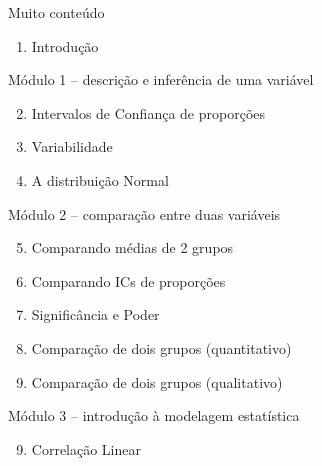 \documentclass{beamer}
\begin{document}
\begin{frame}{\scriptsize Muito conteúdo}
  \begin{enumerate}
    \tiny
  \item Introdução
  \end{enumerate}

  \begin{block}{\scriptsize Módulo 1 -- descrição e inferência de uma variável}
    \begin{enumerate}
      \setcounter{enumi}{1}
      \tiny
    \item Intervalos de Confiança de proporções

    \item Variabilidade

    \item A distribuição Normal

    \end{enumerate}
  \end{block}
  \begin{block}{\scriptsize Módulo 2 -- comparação entre duas variáveis}
    \begin{enumerate}
      \setcounter{enumi}{4}
      \tiny
    \item Comparando médias de 2 grupos

    \item Comparando ICs de proporções

    \item Significância e Poder

    \item Comparação de dois grupos (quantitativo)

    \item Comparação de dois grupos (qualitativo)

    \end{enumerate}
  \end{block}
  \begin{block}{\scriptsize Módulo 3 -- introdução à modelagem estatística}
    \begin{enumerate}
      \setcounter{enumi}{8}
      \tiny
    \item Correlação Linear


\end{enumerate}
\end{block}
\end{frame}
\end{document}
